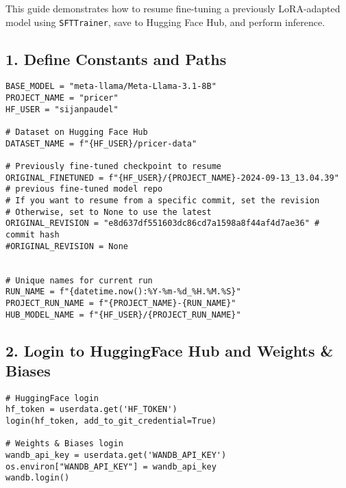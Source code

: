 \documentclass[a4paper, 12pt]{article}
\begin{document}
This guide demonstrates how to resume fine-tuning a previously LoRA-adapted model using \texttt{SFTTrainer}, save to Hugging Face Hub, and perform inference.

\subsection*{1. Define Constants and Paths}
\begin{tcolorbox}[colback=yellow!5!white, colframe=yellow!75!black, title=Project Paths and Model Info]
\begin{verbatim}
BASE_MODEL = "meta-llama/Meta-Llama-3.1-8B"
PROJECT_NAME = "pricer"
HF_USER = "sijanpaudel"

# Dataset on Hugging Face Hub
DATASET_NAME = f"{HF_USER}/pricer-data"

# Previously fine-tuned checkpoint to resume
ORIGINAL_FINETUNED = f"{HF_USER}/{PROJECT_NAME}-2024-09-13_13.04.39"  
# previous fine-tuned model repo
# If you want to resume from a specific commit, set the revision
# Otherwise, set to None to use the latest
ORIGINAL_REVISION = "e8d637df551603dc86cd7a1598a8f44af4d7ae36" # commit hash
#ORIGINAL_REVISION = None


# Unique names for current run
RUN_NAME = f"{datetime.now():%Y-%m-%d_%H.%M.%S}"
PROJECT_RUN_NAME = f"{PROJECT_NAME}-{RUN_NAME}"
HUB_MODEL_NAME = f"{HF_USER}/{PROJECT_RUN_NAME}"
\end{verbatim}
\end{tcolorbox}

\subsection*{2. Login to HuggingFace Hub and Weights \& Biases}
\begin{tcolorbox}[colback=blue!5!white, colframe=blue!75!black, title=Authentication]
\begin{verbatim}
# HuggingFace login
hf_token = userdata.get('HF_TOKEN')
login(hf_token, add_to_git_credential=True)

# Weights & Biases login
wandb_api_key = userdata.get('WANDB_API_KEY')
os.environ["WANDB_API_KEY"] = wandb_api_key
wandb.login()
\end{verbatim}
\end{tcolorbox}

\end{document}
